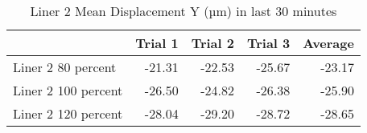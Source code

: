 \begin{table}[htbp]
\centering
\begin{tabular}{lrrrr}
\toprule
  & Trial 1 & Trial 2 & Trial 3 & Average \\
\midrule
 Liner 2 80 percent & -21.31 & -22.53 & -25.67 & -23.17 \\
 Liner 2 100 percent & -26.50 & -24.82 & -26.38 & -25.90 \\
 Liner 2 120 percent & -28.04 & -29.20 & -28.72 & -28.65 \\
\bottomrule
\end{tabular}
\caption{Liner 2 Mean Displacement Y (µm) in last 30 minutes}
\label{fig:liner_2_results_table}
\end{table}